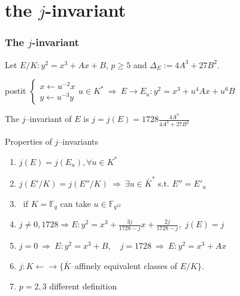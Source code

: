 \documentclass[10pt,handout]{beamer} %
\newcommand{\F}{\mathbb F}
\theoremstyle{definition}
\begin{document}
\section{the \texorpdfstring{$j$}{j}-invariant}
\begin{frame}
\frametitle{The $j$-invariant}
Let  $E/K: y^2=x^3+Ax+B$, $p\ge5$ and $\Delta_E:=4A^3+27B^2$. \pause

\begin{beamercolorbox}[shadow=true,center,rounded=true,wd=9.2cm]{postit} $\begin{cases}
x\longleftarrow u^{-2} x\\
y\longleftarrow u^{-3} y
  \end{cases} u\in K^*\ \Rightarrow\ E\longrightarrow E_u: y^2=x^3+u^4Ax+u^6B$
  \end{beamercolorbox}\pause

\begin{definition} The $j$--invariant of $E$ is
$j=j(E)=1728\frac{4A^3}{4A^3+27B^2}$
\end{definition}

\begin{beamerboxesrounded}[upper=block title example,lower=block body alerted,shadow=true]{Properties of
$j$--invariants}
\begin{enumerate}[<+-| alert@+>]
  \item $j(E)=j(E_u), \forall u\in K^*$
  \item $j(E'/K)=j(E''/K)\ \Rightarrow\ \exists u\in\bar{K}^*$ s.t. $E''=E'_u$
  \item[\ ] \ \hfill if $K=\F_q$ can take $u\in\F_{q^{12}}$
  \item $j\ne 0,1728\Rightarrow E: y^2=x^3+\frac{3j}{1728-j}x+\frac{2j}{1728-j},$ $j(E)=j$
  \item $j=0\ \Rightarrow\ E: y^2=x^3+B,\quad j=1728\ \Rightarrow\ E: y^2=x^3+Ax$
  \item $j: K\leftarrow\!\rightarrow\{\bar{K}$--affinely
  equivalent classes of $E/K\}$.
  \item $p=2, 3$ different definition
\end{enumerate}
\end{beamerboxesrounded}
\end{frame}
\end{document}
